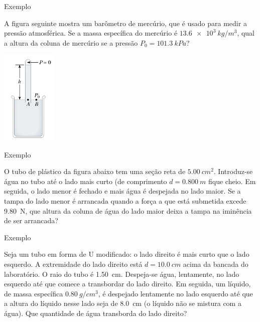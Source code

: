 \begin{frame}{Exemplo}
    \begin{minipage}{\textwidth}
        A figura seguinte mostra um barômetro de mercúrio, que é usado para medir a pressão atmosférica. Se a massa específica do mercúrio é $\SI{13.6e3}{kg/m^3}$, qual a altura da coluna de mercúrio se a pressão $P_0 = \SI{101.3}{kPa}$?
    \end{minipage}
    \begin{center}
        \includegraphics[width=0.2\textwidth]{images/barometro}
    \end{center}
\end{frame}

\begin{frame}{Exemplo}
    \begin{minipage}{\textwidth}
        O tubo de plástico da figura abaixo tem uma seção reta de \(\SI{5,00}{cm^2}\).
        Introduz-se água no tubo até o lado mais curto (de comprimento \(d= \SI{0,800}{m}\) fique
        cheio. Em seguida, o lado menor é fechado e mais água é despejada no lado maior. Se a tampa do lado menor
        é arrancada quando a força a que está submetida excede \SI{9,80}{N}, que altura da coluna de água do lado
        maior deixa a tampa na iminência de ser arrancada?
    \end{minipage}

    \vspace{1cm}\centering
\end{frame}

\begin{frame}{Exemplo}
    \begin{minipage}{\textwidth}
        Seja um tubo em forma de U modificado: o lado direito é mais curto que o lado
        esquerdo. A extremidade do lado direito está \(d=\SI{10,0}{cm}\) acima da bancada do laboratório.
        O raio do tubo é \SI{1,50}{cm}. Despeja-se água, lentamente, no lado esquerdo até que comece a
        transbordar do lado direito. Em seguida, um líquido, de massa específica \(\SI{0,80}{g/cm^3}\), é despejado
        lentamente no lado esquerdo até que a altura do líquido nesse lado seja de \SI{8,0}{cm} (o líquido não
        se mistura com a água). Que quantidade de água transborda do lado direito?
    \end{minipage}
\end{frame}

